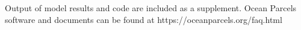 \documentclass{ametsocV5}
\begin{document}
% 
%
\datastatement
Output of model results and code are included as a supplement. Ocean Parcels software and documents can be found at https://oceanparcels.org/faq.html

%






%
%
%


\end{document}
